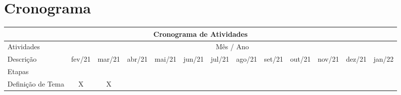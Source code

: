 \chapter{Cronograma}
\label{cap:cronograma}

\begin{table}[ht]
    \centering
    \begin{adjustbox}{width=\textwidth}
        \begin{tabular}{|l|l|l|l|l|l|l|l|l|l|l|l|l|}
            \hline
            \multicolumn{13}{|c|}{\cellcolor[HTML]{009901}Cronograma de Atividades}                                                                                                                                                                                                                                                                                                                          \\ \hline
            Atividades                                                                           & \multicolumn{12}{c|}{Mês / Ano}                                                                                                                                                                                                                                                                           \\ \hline
            Descrição                                                                            & fev/21                 & mar/21                 & abr/21                 & mai/21                 & jun/21                 & jul/21                 & ago/21                 & set/21                 & out/21                 & nov/21                 & dez/21                 & jan/22                 \\ \hline
            \multicolumn{13}{|l|}{\cellcolor[HTML]{3531FF}Etapas}                                                                                                                                                                                                                                                                                                                                            \\ \hline
            Definição de Tema                                                                    & \multicolumn{1}{c|}{X} & \multicolumn{1}{c|}{X} &                        &                        &                        &                        &                        &                        &                        &                        &                        &                        \\ \hline

\end{tabular}
\end{adjustbox}
\end{table}
